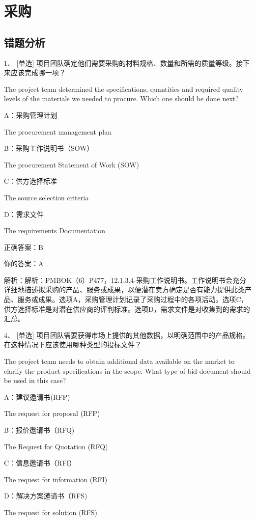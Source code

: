 
\chapter{采购}

\section{错题分析}

1、 [单选] 项目团队确定他们需要采购的材料规格、数量和所需的质量等级。接下来应该完成哪一项？

The project team determined the specifications, quantities and required quality levels of the materials we needed to procure. Which one should be done next?

A：采购管理计划

The procurement management plan

B：采购工作说明书（SOW）

The procurement Statement of Work (SOW)

C：供方选择标准

The source selection criteria

D：需求文件

The requirements Documentation

正确答案：B

你的答案：A

解析：解析：PMBOK（6）P477，12.1.3.4-采购工作说明书。工作说明书会充分详细地描述拟采购的产品、服务或成果，以便潜在卖方确定是否有能力提供此类产品、服务或成果。选项A，采购管理计划记录了采购过程中的各项活动。选项C，供方选择标准是对潜在供应商的评判标准。选项D，需求文件是对收集到的需求的汇总。

4、 [单选] 项目团队需要获得市场上提供的其他数据，以明确范围中的产品规格。在这种情况下应该使用哪种类型的投标文件？

The project team needs to obtain additional data available on the market to clarify the product specifications in the scope. What type of bid document should be used in this case?

A：建议邀请书(RFP)

The request for proposal (RFP)

B：报价邀请书（RFQ)

The Request for Quotation (RFQ)

C：信息邀请书（RFI）

The request for information (RFI)

D：解决方案邀请书（RFS)

The request for solution (RFS)

